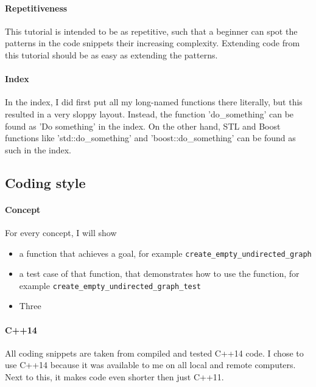 \paragraph{Repetitiveness}

This tutorial is intended to be as repetitive, such that a beginner can
 spot the patterns in the code snippets their increasing complexity.
 Extending code from this tutorial should be as easy as extending the patterns.

\paragraph{Index}

In the index, I did first put all my long-named functions there literally,
but this resulted in a very sloppy layout.
Instead, the function 'do\_something' can be found as 'Do something' in
the index.
On the other hand, STL and Boost functions like 'std::do\_something' and
'boost::do\_something' can be found as such in the index.

\subsection{Coding style}

\paragraph{Concept}

For every concept, I will show

\begin{itemize}
    \item a function that achieves a goal, 
      for example \verb;create_empty_undirected_graph;
    \item{
      a test case of that function, 
      that demonstrates how to use the function, for example
      \verb;create_empty_undirected_graph_test;
    }
    \item Three
\end{itemize}

\paragraph{C++14}

All coding snippets are taken from compiled and tested C++14 code.
I chose to use C++14 because it was available to me on all local and remote
computers.
Next to this, it makes code even shorter then just C++11.

